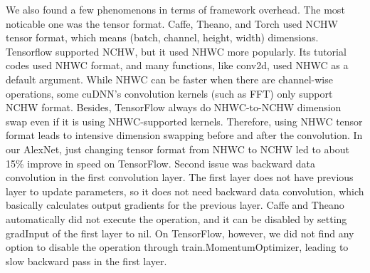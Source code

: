 We also found a few phenomenons in terms of framework overhead.
The most noticable one was the tensor format.
Caffe, Theano, and Torch used NCHW tensor format, which means (batch, channel, height, width) dimensions.
Tensorflow supported NCHW, but it used NHWC more popularly.
Its tutorial codes used NHWC format, and many functions, like conv2d, used NHWC as a default argument.
While NHWC can be faster when there are channel-wise operations, some cuDNN's convolution kernels (such as FFT) only support NCHW format.
Besides, TensorFlow always do NHWC-to-NCHW dimension swap even if it is using NHWC-supported kernels.
Therefore, using NHWC tensor format leads to intensive dimension swapping before and after the convolution.
In our AlexNet, just changing tensor format from NHWC to NCHW led to about 15\% improve in speed on TensorFlow.
Second issue was backward data convolution in the first convolution layer.
The first layer does not have previous layer to update parameters, so it does not need backward data convolution, which basically calculates output gradients for the previous layer.
Caffe and Theano automatically did not execute the operation, and it can be disabled by setting gradInput of the first layer to nil.
On TensorFlow, however, we did not find any option to disable the operation through train.MomentumOptimizer, leading to slow backward pass in the first layer.



